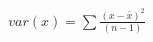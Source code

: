 \documentclass[10pt]{article}
\begin{document}
\begin{align*}var(x) = \sum\frac{(x - \bar{x})^2}{(n-1)}\end{align*}
\end{document}
